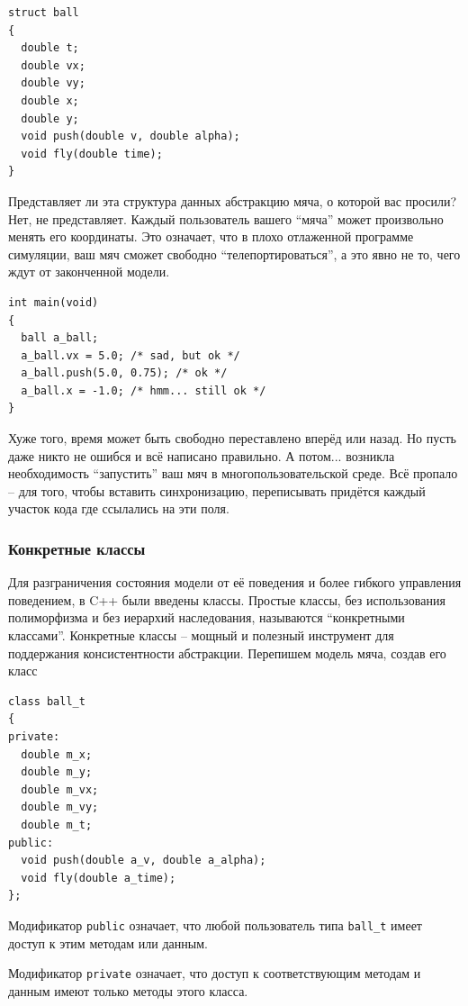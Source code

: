 \documentclass[a4paper,12pt,oneside]{article}
\begin{document}
\begin{lstlisting}
struct ball
{
  double t;
  double vx;
  double vy;
  double x;
  double y;
  void push(double v, double alpha);
  void fly(double time);
}
\end{lstlisting}

Представляет ли эта структура данных абстракцию мяча, о которой вас просили? Нет, не представляет. Каждый пользователь вашего ``мяча'' может произвольно менять его координаты. Это означает, что в плохо отлаженной программе симуляции, ваш мяч сможет свободно ``телепортироваться'', а это явно не то, чего ждут от законченной модели. 

\begin{lstlisting}
int main(void)
{
  ball a_ball;
  a_ball.vx = 5.0; /* sad, but ok */
  a_ball.push(5.0, 0.75); /* ok */
  a_ball.x = -1.0; /* hmm... still ok */
}
\end{lstlisting}

Хуже того, время может быть свободно переставлено вперёд или назад. Но пусть даже никто не ошибся и всё написано правильно. А потом... возникла необходимость ``запустить'' ваш мяч в многопользовательской среде. Всё пропало – для того, чтобы вставить синхронизацию, переписывать придётся каждый участок кода где ссылались на эти поля.

\subsubsection{Конкретные классы}

Для разграничения состояния модели от её поведения и более гибкого управления поведением, в C++ были введены классы. Простые классы, без использования полиморфизма и без иерархий наследования, называются ``конкретными классами''. Конкретные классы -- мощный и полезный инструмент для поддержания консистентности абстракции. Перепишем модель мяча, создав его класс

\begin{lstlisting}
class ball_t
{
private:
  double m_x;
  double m_y;
  double m_vx;
  double m_vy;
  double m_t;
public:
  void push(double a_v, double a_alpha);
  void fly(double a_time);
};
\end{lstlisting}

Модификатор \lstinline!public! означает, что любой пользователь типа \lstinline!ball_t! имеет доступ к этим методам или данным. 

Модификатор \lstinline!private! означает, что доступ к соответствующим методам и данным имеют только методы этого класса.
\end{document}
